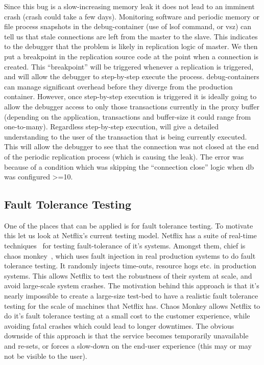 Since this bug is a slow-increasing memory leak it does not lead to an imminent crash (crash could take a few days). 
Monitoring software and periodic memory or file process snapshots in the debug-container (use of lsof command, or vsz) can tell us that stale connections are left from the master to the slave.
This indicates to the debugger that the problem is likely in replication logic of master.
We then put a breakpoint in the replication source code at the point when a connection is created.
This ``breakpoint'' will be triggered whenever a replication is triggered, and will allow the debugger to step-by-step execute the process.
\parikshan debug-containers can manage significant overhead before they diverge from the production container. 
However, once step-by-step execution is triggered it is ideally going to allow the debugger access to only those transactions currently in the proxy buffer (depending on the application, transactions and buffer-size it could range from one-to-many). 
Regardless step-by-step execution, will give a detailed understanding to the user of the transaction that is being currently executed.
This will allow the debugger to see that the connection was not closed at the end of the periodic replication process (which is causing the leak).
The error was because of a condition which was skipping the ``connection close'' logic when db was configured \textgreater=10.

\subsection{Fault Tolerance Testing}

One of the places that \parikshan can be applied is for fault tolerance testing.
To motivate this let us look at Netflix's current testing model.
Netflix has a suite of real-time techniques~\cite{chaosengineering} for testing fault-tolerance of it's systems.
Amongst them, chief is chaos monkey~\cite{chaosmonkey}, which uses fault injection in real production systems to do fault tolerance testing.
It randomly injects time-outs, resource hogs etc. in production systems. 
This allows Netflix to test the robustness of their system at scale, and avoid large-scale system crashes. 
The motivation behind this approach is that it's nearly impossible to create a large-size test-bed to have a realistic fault tolerance testing for the scale of machines that Netflix has. 
Chaos Monkey allows Netflix to do it's fault tolerance testing at a small cost to the customer experience, while avoiding fatal crashes which could lead to longer downtimes.
The obvious downside of this approach is that the service becomes temporarily unavailable and re-sets, or forces a slow-down on the end-user experience (this may or may not be visible to the user). 

